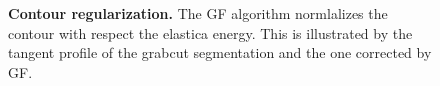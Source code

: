 \documentclass[smallextended]{svjour3}
\begin{document}
\begin{figure}
\caption{\textbf{Contour regularization.} The GF algorithm normlalizes the contour with respect the elastica energy. This is illustrated by the tangent profile of the grabcut segmentation and the one corrected by GF.}
\label{fig:coco-tangent-profile}
\end{figure}
%
%
\end{document}
